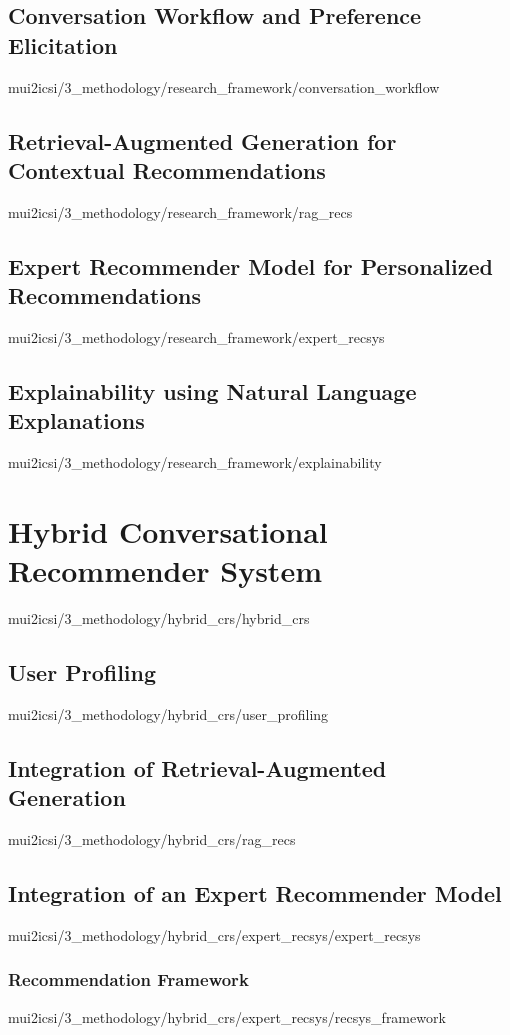\documentclass[english,epsbased,copyright,final,printable,covers,extendedindex,firstnumbered,tfm,gnuplot,loc,loe,lof,lot]{tfgtfmthesisuam}
\begin{document}
      \subsection{Conversation Workflow and Preference Elicitation\label{SS:CONVPREF}}{mui2icsi/3_methodology/research_framework/conversation_workflow}
      \subsection{Retrieval-Augmented Generation for Contextual Recommendations\label{SS:RAGRECS}}{mui2icsi/3_methodology/research_framework/rag_recs}
      \subsection{Expert Recommender Model for Personalized Recommendations\label{SS:EXPERTRECSYS}}{mui2icsi/3_methodology/research_framework/expert_recsys}
      \subsection{Explainability using Natural Language Explanations\label{SS:EXPLAINNLE}}{mui2icsi/3_methodology/research_framework/explainability}

    \section{Hybrid Conversational Recommender System\label{SEC:HYBRIDCRS}}{mui2icsi/3_methodology/hybrid_crs/hybrid_crs}
      \subsection{User Profiling\label{SS:USERPROF}}{mui2icsi/3_methodology/hybrid_crs/user_profiling}
      \subsection{Integration of Retrieval-Augmented Generation\label{SS:INTEGRAGRECS}}{mui2icsi/3_methodology/hybrid_crs/rag_recs}
      \subsection{Integration of an Expert Recommender Model\label{SS:INTEGEXPERTRECSYS}}{mui2icsi/3_methodology/hybrid_crs/expert_recsys/expert_recsys}
        \subsubsection{Recommendation Framework\label{SSS:RECFRAMEWORK}}{mui2icsi/3_methodology/hybrid_crs/expert_recsys/recsys_framework}
\end{document}

